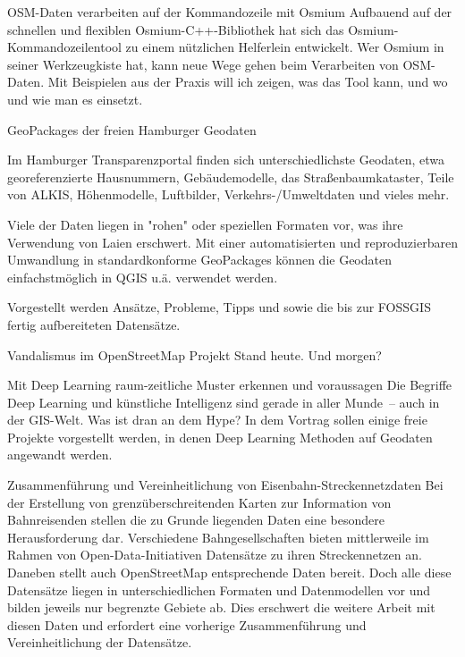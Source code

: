 %
{OSM-Daten verarbeiten auf der Kommandozeile mit Osmium}%
{}%
{Aufbauend auf der schnellen und flexiblen Osmium-C++-Bibliothek hat sich das
Osmium-Kommandozeilentool zu einem nützlichen Helferlein entwickelt. Wer Osmium in seiner
Werkzeugkiste hat, kann neue Wege gehen beim Verarbeiten von OSM-Daten. Mit Beispielen aus der
Praxis will ich zeigen, was das Tool kann, und wo und wie man es einsetzt.}

%
{GeoPackages der freien Hamburger Geodaten}%
{}%
{Im Hamburger Transparenzportal finden sich unterschiedlichste Geodaten, etwa georeferenzierte
  Hausnummern, Gebäudemodelle, das Straßenbaumkataster, Teile von ALKIS, Höhenmodelle, Luftbilder,
  Verkehrs-/Umweltdaten und vieles mehr.

Viele der Daten liegen in "rohen" oder speziellen Formaten vor, was ihre Verwendung von Laien
erschwert. Mit einer automatisierten und reproduzierbaren Umwandlung in standardkonforme GeoPackages
können die Geodaten einfachstmöglich in QGIS u.ä. verwendet werden.

Vorgestellt werden Ansätze, Probleme, Tipps und sowie die bis zur FOSSGIS fertig aufbereiteten
Datensätze.}

%
{Vandalismus im OpenStreetMap Projekt}%
{Stand heute. Und morgen?}%
{}
{}

%
{Mit Deep Learning raum-zeitliche Muster erkennen und voraussagen}%
{}%
{Die Begriffe Deep Learning und künstliche Intelligenz sind gerade in aller Munde~--
auch in der GIS-Welt. Was ist dran an dem Hype? In dem Vortrag sollen einige
freie Projekte vorgestellt werden, in denen Deep Learning Methoden auf Geodaten
angewandt werden.}

%
{Zusammenführung und Vereinheitlichung von Eisenbahn-Streckennetzdaten}%
{}%
{Bei der Erstellung von grenzüberschreitenden Karten zur Information von Bahnreisenden stellen die
zu Grunde liegenden Daten eine besondere Herausforderung dar. Verschiedene Bahngesellschaften bieten
mittlerweile im Rahmen von Open-Data-Initiativen Datensätze zu ihren Streckennetzen an. Daneben
stellt auch OpenStreetMap entsprechende Daten bereit. Doch alle diese Datensätze liegen in
unterschiedlichen Formaten und Datenmodellen vor und bilden jeweils nur begrenzte Gebiete ab. Dies
erschwert die weitere Arbeit mit diesen Daten und erfordert eine vorherige Zusammenführung und
Vereinheitlichung der Datensätze.}

